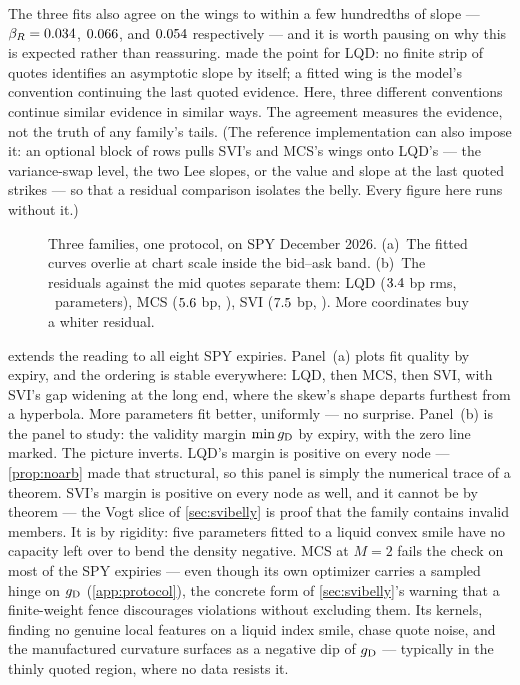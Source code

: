 The three fits also agree on the wings to within a few hundredths of
slope --- $\beta_R=0.034$, $0.066$, and
$0.054$ respectively --- and it is worth pausing on why
this is expected rather than reassuring.   made the
point for LQD: no finite strip of quotes identifies an asymptotic
slope by itself; a fitted wing is the model's convention continuing
the last quoted evidence.  Here, three different conventions continue
similar evidence in similar ways.  The agreement measures the
evidence, not the truth of any family's tails.  (The reference
implementation can also impose it: an optional block of rows pulls
SVI's and MCS's wings onto LQD's --- the variance-swap level, the two
Lee slopes, or the value and slope at the last quoted strikes --- so
that a residual comparison isolates the belly.  Every figure here
runs without it.)

\begin{figure}[htbp]
\centering
{}
\caption{Three families, one protocol, on SPY December 2026.  (a)~The
fitted curves overlie at chart scale inside the bid--ask band.
(b)~The residuals against the mid quotes separate them: LQD
($3.4$ bp rms, \MacCmpSpyLqdPar\ parameters), MCS
($5.6$ bp, \MacCmpSpyMcsPar), SVI ($7.5$ bp,
\MacCmpSpySviPar).  More coordinates buy a whiter residual.}
\label{fig:cmpnode}
\end{figure}

 extends the reading to all eight SPY expiries.
Panel~(a) plots fit quality by expiry, and the ordering is stable
everywhere: LQD, then MCS, then SVI, with SVI's gap widening at the
long end, where the skew's shape departs furthest from a hyperbola.
More parameters fit better, uniformly --- no surprise.  Panel~(b) is
the panel to study: the validity margin $\min g_{\rm D}$ by expiry,
with the zero line marked.  The picture inverts.  LQD's margin is
positive on every node --- \cref{prop:noarb} made that structural, so
this panel is simply the numerical trace of a theorem.  SVI's margin
is positive on every node as well, and it cannot be by theorem --- the
Vogt slice of \cref{sec:svibelly} is proof that the family contains
invalid members.  It is by rigidity: five parameters fitted to a
liquid convex smile have no capacity left over to bend the density
negative.  MCS at
$M=2$ fails the check on most of the SPY expiries --- even though its
own optimizer carries a sampled hinge on $g_{\rm D}$
(\cref{app:protocol}), the concrete form of \cref{sec:svibelly}'s
warning that a finite-weight fence discourages violations without
excluding them.  Its kernels, finding no genuine local features on a
liquid index smile, chase quote noise, and the manufactured curvature
surfaces as a negative dip of $g_{\rm D}$ --- typically in the thinly
quoted region, where no data resists it.


